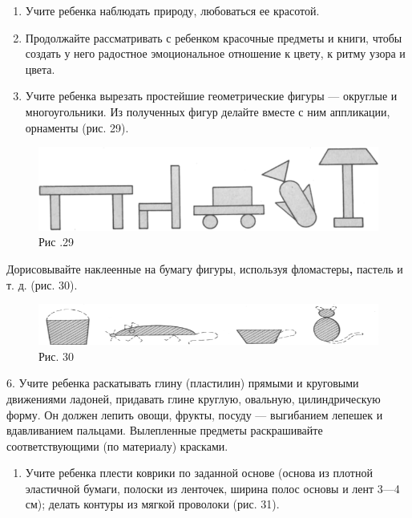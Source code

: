 \documentclass{book}
\begin{document}
\begin{enumerate}
\def\labelenumi{\arabic{enumi}.}
\setcounter{enumi}{2}
\item
  
  Учите ребенка наблюдать природу, любоваться ее красотой.
  
\item
  
  Продолжайте рассматривать с ребенком красочные предметы и книги, чтобы
  создать у него радостное эмоциональное отношение к цвету, к ритму
  узора и цвета.
  
\item
  
  Учите ребенка вырезать простейшие геометрические фигуры --- округлые и
  многоугольники. Из полученных фигур делайте вместе с ним аппликации,
  орнаменты (рис. 29).
  
\end{enumerate}


\begin{figure}
\centering
\includegraphics[width=\linewidth]{media/media/image26.png}
\caption*{Рис .29}
\end{figure}

Дорисовывайте наклеенные на бумагу фигуры, используя
фломастеры\textbf{,} пастель и т. д. (рис. 30).

\begin{figure}
\centering
\includegraphics[width=\linewidth]{media/media/image27.png}
\caption*{Рис. 30}
\end{figure}

6. Учите ребенка раскатывать глину (пластилин) прямыми и круговыми
движениями ладоней, придавать глине круглую, овальную, цилиндрическую
форму. Он должен лепить овощи, фрукты, посуду --- выгибанием лепешек и
вдавливанием пальцами. Вылепленные предметы раскрашивайте
соответствующими (по материалу) красками.


\begin{enumerate}
\def\labelenumi{\arabic{enumi}.}
\setcounter{enumi}{6}
\item
  
  Учите ребенка плести коврики по заданной основе (основа из плотной
  эластичной бумаги, полоски из ленточек, ширина полос основы и лент
  3---4 см); делать контуры из мягкой проволоки (рис. 31).
  
\end{enumerate}
\end{document}
